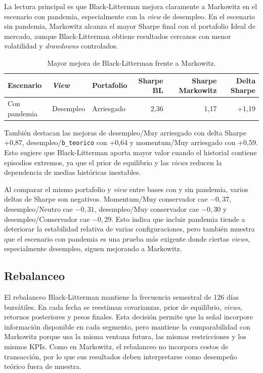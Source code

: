 La lectura principal es que Black-Litterman mejora claramente a Markowitz en el
escenario con pandemia, especialmente con la \textit{view} de desempleo. En el
escenario sin pandemia, Markowitz alcanza el mayor Sharpe final con el
portafolio Ideal de mercado, aunque Black-Litterman obtiene resultados cercanos
con menor volatilidad y \textit{drawdowns} controlados.

\begin{table}[H]
\centering
\caption{Mayor mejora de Black-Litterman frente a Markowitz.}
\label{tab:anexo4_bl_delta_markowitz}
\small
\begin{tabular}{@{}lllrrr@{}}
\toprule
Escenario & \textit{View} & Portafolio & Sharpe BL & Sharpe Markowitz & Delta Sharpe \\
\midrule
Con pandemia & Desempleo & Arriesgado & 2,36 & 1,17 & +1,19 \\
\bottomrule
\end{tabular}
\end{table}

Tambi\'en destacan las mejoras de desempleo/Muy arriesgado con delta Sharpe
+0,87, desempleo/\texttt{b\_teorico} con +0,64 y momentum/Muy arriesgado con
+0,59. Esto sugiere que Black-Litterman aporta mayor valor cuando el historial
contiene episodios extremos, ya que el prior de equilibrio y las \textit{views}
reducen la dependencia de medias hist\'oricas inestables.

Al comparar el mismo portafolio y \textit{view} entre bases con y sin pandemia,
varios deltas de Sharpe son negativos. Momentum/Muy conservador cae $-0,37$,
desempleo/Neutro cae $-0,31$, desempleo/Muy conservador cae $-0,30$ y
desempleo/Conservador cae $-0,29$. Esto indica que incluir pandemia tiende a
deteriorar la estabilidad relativa de varias configuraciones, pero tambi\'en
muestra que el escenario con pandemia es una prueba m\'as exigente donde ciertas
\textit{views}, especialmente desempleo, siguen mejorando a Markowitz.

\subsection*{Rebalanceo}

El rebalanceo Black-Litterman mantiene la frecuencia semestral de 126 d\'ias
burs\'atiles. En cada fecha se reestiman covarianzas, prior de equilibrio,
\textit{views}, retornos posteriores y pesos finales. Esta decisi\'on permite que
la se\~nal incorpore informaci\'on disponible en cada segmento, pero mantiene la
comparabilidad con Markowitz porque usa la misma ventana futura, las mismas
restricciones y los mismos KPIs. Como en Markowitz, el rebalanceo no incorpora
costos de transacci\'on, por lo que sus resultados deben interpretarse como
desempe\~no te\'orico fuera de muestra.

